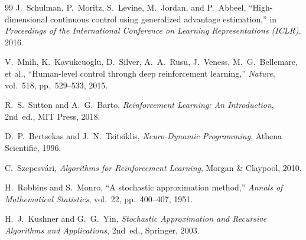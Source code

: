 \documentclass[11pt,a4paper]{article}
\theoremstyle{definition}
\theoremstyle{plain}
\theoremstyle{remark}
\begin{document}
\begin{thebibliography}{99}
J.~Schulman, P.~Moritz, S.~Levine, M.~Jordan, and P.~Abbeel,
``High-dimensional continuous control using generalized advantage estimation,''
in \emph{Proceedings of the International Conference on Learning Representations (ICLR)}, 2016.

V.~Mnih, K.~Kavukcuoglu, D.~Silver, A.~A.~Rusu, J.~Veness, M.~G.~Bellemare, et al.,
``Human-level control through deep reinforcement learning,''
\emph{Nature}, vol.~518, pp.~529--533, 2015.

R.~S.~Sutton and A.~G.~Barto, \emph{Reinforcement Learning: An Introduction}, 2nd~ed.,
MIT Press, 2018.

D.~P.~Bertsekas and J.~N.~Tsitsiklis, \emph{Neuro-Dynamic Programming},
Athena Scientific, 1996.

C.~Szepesv\'{a}ri, \emph{Algorithms for Reinforcement Learning},
Morgan \& Claypool, 2010.

H.~Robbins and S.~Monro, ``A stochastic approximation method,''
\emph{Annals of Mathematical Statistics}, vol.~22, pp.~400--407, 1951.

H.~J.~Kushner and G.~G.~Yin, \emph{Stochastic Approximation and Recursive Algorithms and Applications}, 2nd~ed.,
Springer, 2003.

\end{thebibliography}
\end{document}
